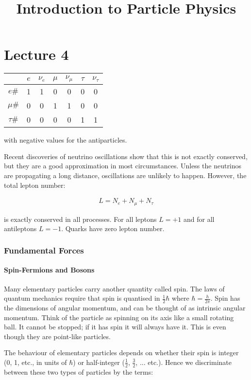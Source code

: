 \documentclass[10pt,a4paper]{article}
\title{Introduction to Particle Physics}
\newcommand{\nue}{\nu_{e}}
\newcommand{\numu}{\nu_{\mu}}
\newcommand{\nutau}{\nu_{\tau}}
\begin{document}
\part*{Lecture 4}

\begin{tabular}{c|c|c|c|c|c|c}
\hline
& $e$ & $\nue$ & $\mu$ & $\numu$ & $\tau$ & $\nutau$ \\
\hline
$e\#$ & 1 & 1 & 0 & 0 & 0 & 0 \\
\hline
$\mu\#$ & 0 & 0 & 1 & 1 & 0 & 0 \\
\hline
$\tau\#$ & 0 & 0 & 0 & 0 & 1 & 1 \\
\hline
\end{tabular}

with negative values for the antiparticles.

Recent discoveries of neutrino oscillations show that this is not exactly conserved, but they are a good approximation in most circumstances. Unless the neutrinos are propagating a long distance, oscillations are unlikely to happen. However, the total lepton number:

\begin{align*}
L = N_{e} + N_{\mu} + N_{\tau}
\end{align*}

is exactly conserved in all processes. For all leptons $L = +1$ and for all antileptons $L = -1$. Quarks have zero lepton number.

\section*{Fundamental Forces}

\subsection*{Spin-Fermions and Bosons}

Many elementary particles carry another quantity called spin. The laws of quantum mechanics require that spin is quantised in $\frac{1}{2}\hbar$ where $\hbar = \frac{h}{2\pi}$. Spin has the dimensions of angular momentum, and can be thought of as intrinsic angular momentum. Think of the particle as spinning on its axis like a small rotating ball. It cannot be stopped; if it has spin it will always have it. This is even though they are point-like particles.

The behaviour of elementary particles depends on whether their spin is integer (0, 1, etc., in units of $\hbar$) or half-integer ($\frac{1}{2}$, $\frac{3}{2}$, ... etc.). Hence we discriminate between these two types of particles by the terms:
\end{document}
